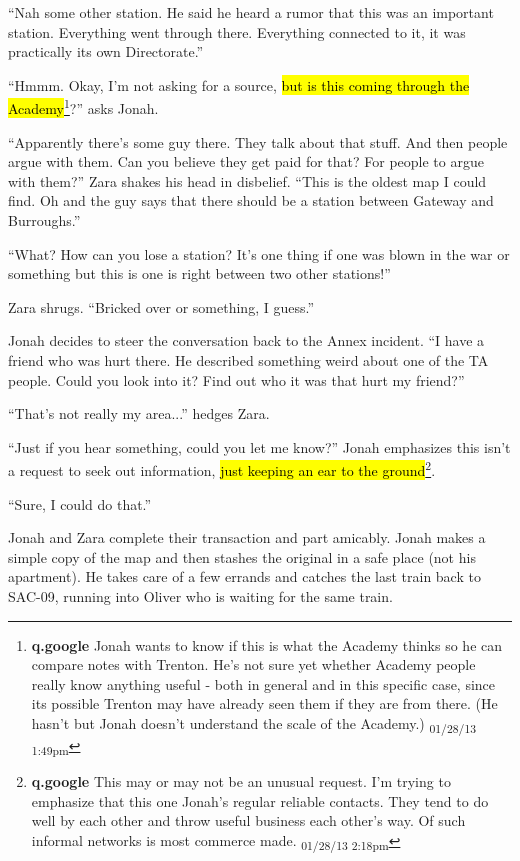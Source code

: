 ``Nah some other station.  He said he heard a rumor that this was an important station. Everything went through there.  Everything connected to it, it was practically its own Directorate.''

``Hmmm.  Okay, I'm not asking for a source, \hl{but is this coming through the Academy}\footnote{\textbf{q.google }Jonah wants to know if this is what the Academy thinks so he can compare notes with Trenton.  He's not sure yet whether Academy people really know anything useful - both in general and in this specific case, since its possible Trenton may have already seen them if they are from there.  (He hasn't but Jonah doesn't understand the scale of the Academy.) \textsubscript{01/28/13 1:49pm}}?'' asks Jonah.

``Apparently there's some guy there. They talk about that stuff.  And then people argue with them.  Can you believe they get paid for that?  For people to argue with them?'' Zara shakes his head in disbelief.  ``This is the oldest map I could find.  Oh and the guy says that there should be a station between Gateway and Burroughs.''

``What?  How can you lose a station?  It's one thing if one was blown in the war or something but this is one is right between two other stations!''

Zara shrugs.  ``Bricked over or something, I guess.''



Jonah decides to steer the conversation back to the Annex incident.  ``I have a friend who was hurt there.  He described something weird about one of the TA people.  Could you look into it?  Find out who it was that hurt my friend?''

``That's not really my area...'' hedges Zara.

``Just if you hear something, could you let me know?''  Jonah emphasizes this isn't a request to seek out information, \hl{just keeping an ear to the ground}\footnote{\textbf{q.google }This may or may not be an unusual request.  I'm trying to emphasize that this one Jonah's regular reliable contacts.  They tend to do well by each other and throw useful business each other's way.  Of such informal networks is most commerce made. \textsubscript{01/28/13 2:18pm}}.

``Sure, I could do that.''



Jonah and Zara complete their transaction and part amicably.  Jonah makes a simple copy of the map and then stashes the original in a safe place (not his apartment).  He takes care of a few errands and catches the last train back to SAC-09, running into Oliver who is waiting for the same train.





